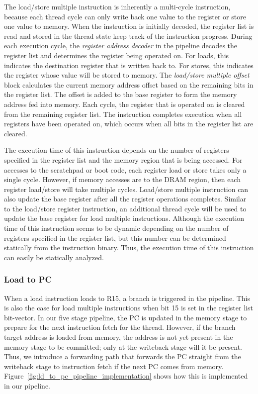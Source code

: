 The load/store multiple instruction is inherently a multi-cycle instruction, because each thread cycle can only write back one value to the register or store one value to memory.
When the instruction is initially decoded, the register list is read and stored in the thread state keep track of the instruction progress.   
During each execution cycle, the \emph{register address decoder} in the pipeline decodes the register list and determines the register being operated on.
For loads, this indicates the destination register that is written back to.
For stores, this indicates the register whose value will be stored to memory.
The \emph{load/store multiple offset} block calculates the current memory address offset based on the remaining bits in the register list.
The offset is added to the base register to form the memory address fed into memory.
Each cycle, the register that is operated on is cleared from the remaining register list. 
The instruction completes execution when all registers have been operated on, which occurs when all bits in the register list are cleared. 

The execution time of this instruction depends on the number of registers specified in the register list and the memory region that is being accessed. 
For accesses to the scratchpad or boot code, each register load or store takes only a single cycle. 
However, if memory accesses are to the DRAM region, then each register load/store will take multiple cycles.
Load/store multiple instruction can also update the base register after all the register operations completes. 
Similar to the load/store register instruction, an additional thread cycle will be used to update the base register for load multiple instructions.
Although the execution time of this instruction seems to be dynamic depending on the number of registers specified in the register list, but this number can be determined statically from the instruction binary. 
Thus, the execution time of this instruction can easily be statically analyzed.   

\subsubsection{Load to PC}
\label{sec:load_to_pc}    
When a load instruction loads to R15, a branch is triggered in the pipeline.
This is also the case for load multiple instructions when bit 15 is set in the register list bit-vector.
In our five stage pipeline, the PC is updated in the memory stage to prepare for the next instruction fetch for the thread.   
However, if the branch target address is loaded from memory, the address is not yet present in the memory stage to be committed; only at the writeback stage will it be present. 
Thus, we introduce a forwarding path that forwards the PC straight from the writeback stage to instruction fetch if the next PC comes from memory. 
Figure~\ref{fig:ld_to_pc_pipeline_implementation} shows how this is implemented in our pipeline.   

